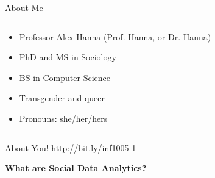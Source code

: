 \documentclass{beamer}
\begin{document}
\begin{frame}{About Me}
  \begin{columns}
    \begin{column}{0.5\textwidth}
        \begin{itemize}[<+->]
          \item Professor Alex Hanna (Prof. Hanna, or Dr. Hanna)
          \item PhD and MS in Sociology
          \item BS in Computer Science
          \item Transgender and queer
          \item Pronouns: she/her/hers
        \end{itemize}
    \end{column}
    \begin{column}{0.5\textwidth}
    \end{column}
  \end{columns}
\end{frame}

\begin{frame}{About You!}
  \centering
  \url{http://bit.ly/inf1005-1}
\end{frame}

\begin{frame}[plain]
  \begin{center}
    \bf \LARGE What are Social Data Analytics?
  \end{center}
\end{frame}
\end{document}

